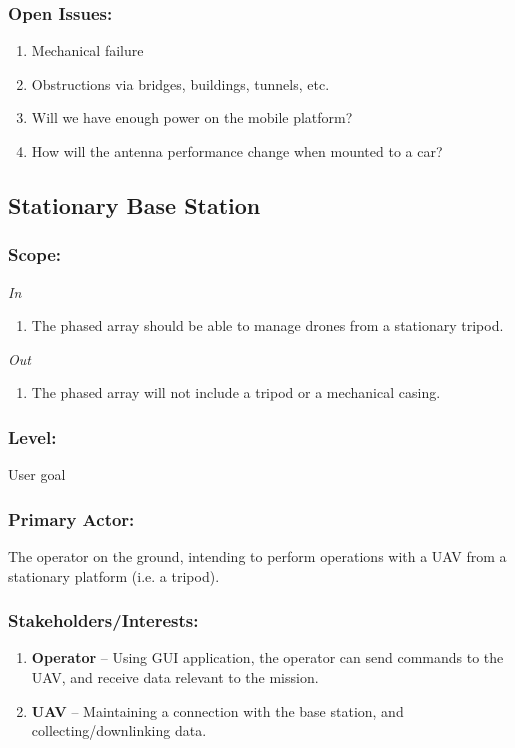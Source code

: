 \documentclass[ProductRequirements.tex]{subfiles}
\begin{document}
	\subsubsection*{Open Issues:}
	\begin{enumerate}\itemsep1pt
		\item Mechanical failure
		\item Obstructions via bridges, buildings, tunnels, etc.
		\item Will we have enough power on the mobile platform?
		\item How will the antenna performance change when mounted to a car?
	\end{enumerate}	
	
	\subsection{Stationary Base Station}
	\subsubsection*{Scope:}
	\textit{In}
	\begin{enumerate}
		\item The phased array should be able to manage drones from a stationary tripod.
	\end{enumerate}
	\textit{Out}
	\begin{enumerate}
		\item The phased array will not include a tripod or a mechanical casing.
	\end{enumerate}
	\subsubsection*{Level:}
	User goal
	\subsubsection*{Primary Actor:}
	The operator on the ground, intending to perform operations with a UAV from a stationary platform (i.e. a tripod).
	\subsubsection*{Stakeholders/Interests:}
	\begin{enumerate}\itemsep1pt
		\item \textbf{Operator} -- Using GUI application, the operator can send commands to the UAV, and receive data relevant to the mission. 
		\item \textbf{UAV} -- Maintaining a connection with the base station, and collecting/downlinking data. 
	\end{enumerate}
\end{document}
